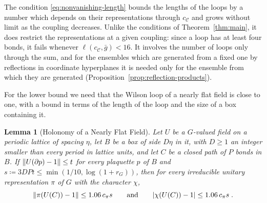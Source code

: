 \documentclass[11pt]{preprint}
\DeclarePairedDelimiter{\abs}{\lvert}{\rvert}
\DeclarePairedDelimiter{\norm}{\lVert}{\rVert}
\numberwithin{equation}{section}
\newtheorem{lemma}[theorem]{Lemma}
\theoremstyle{definition}
\theoremstyle{remark}
\theoremstyle{plain}
\begin{document}
The condition \eqref{eq:nonvanishing-length} bounds the lengths of the loops by a number which depends on their representations through $c_{\mathcal C}$ and grows without limit as the coupling decreases. Unlike the conditions of Theorem~\ref{thm:main}, it does restrict the representations at a given coupling: since a loop has at least four bonds, it fails whenever $\ell(c_{\mathcal C}, \bar g) < 16$. It involves the number of loops only through the sum, and for the ensembles which are generated from a fixed one by reflections in coordinate hyperplanes it is needed only for the ensemble from which they are generated (Proposition~\ref{prop:reflection-products}).

For the lower bound we need that the Wilson loop of a nearly flat field is close to one, with a bound in terms of the length of the loop and the size of a box containing it.

\begin{lemma}[Holonomy of a Nearly Flat Field]\label{lem:flat-holonomy}
Let $U$ be a $G$-valued field on a periodic lattice of spacing $\eta$, let $B$ be a box of side $D\eta$ in it, with $D \geq 1$ an integer smaller than every period in lattice units, and let $C$ be a closed path of $P$ bonds in $B$. If $\norm{U(\partial p) - 1} \leq t$ for every plaquette $p$ of $B$ and $s \coloneqq 3DPt \leq \min(1/10, \log(1 + r_G))$, then for every irreducible unitary representation $\pi$ of $G$ with the character $\chi$,
\begin{equation}\label{eq:flat-holonomy}
    \norm{\pi(U(C)) - 1} \leq 1.06\,c_\pi s
    \qquad\text{and}\qquad
    \abs{\chi(U(C)) - 1} \leq 1.06\,c_\pi s\;.
\end{equation}
\end{lemma}
\end{document}
